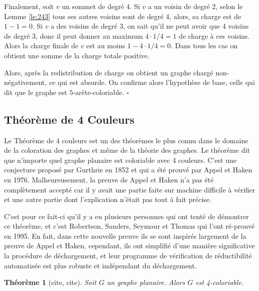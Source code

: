 \documentclass[10pt,a4paper]{article}
\newtheorem{theorem}{Théorème}
\newcommand{\ep}{{\hfill $\square$}}
\begin{document}
Finalement, soit $v$ un sommet de degré 4. Si $v$ a un voisin de degré 2, selon le Lemme \ref{le:243} tous ses autres voisins sont de degré 4, alors, sa charge est de $1-1=0$. Si $v$ a des voisins de degré 3, on sait qu'il ne peut avoir que 4 voisins de degré 3, donc il peut donner au maximum $4 \cdot 1/4=1$ de charge à ces voisins. Alors la charge finale de $v$ est au moins $1 - 4\cdot 1/4 = 0$. Dans tous les cas on obtient une somme de la charge totale positive.

Alors, après la redistribution de charge on obtient un graphe chargé non-négativement, ce qui est absurde. On confirme alors l'hypothèse de base, celle qui dit que le graphe est $5$-arête-coloriable.
\ep 


\subsection{Théorème de 4 Couleurs}

Le Théorème de 4 couleurs est un des théorèmes le plus connu dans le domaine de la coloration des graphes et même de la théorie des graphes. Le théorème dit que n'importe quel graphe planaire est coloriable avec 4 couleurs. C'est une conjecture proposé par Gurthrie en 1852 et qui a été prouvé par Appel et Haken \cite{A&H} en 1976. Malheureusement, la preuve de Appel et Haken n'a pas été complètement accepté car il y avait une partie faite sur machine difficile à vérifier et une autre partie dont l'explication n'était pas tout à fait précise.

C'est pour ce fait-ci qu'il y a eu plusieurs personnes qui ont tenté de démontrer ce théorème, et c'est Robertson, Sanders, Seymour et Thomas \cite{T4C} qui l'ont ré-prouvé en 1995. En fait, dans cette nouvelle preuve ils se sont inspirés largement de la preuve de Appel et Haken, cependant, ils ont simplifié d'une manière significative la procédure de déchargement, et leur programme de vérification de réductibilité automatisée est plus robuste et indépendant du déchargement.

\begin{theorem}[cite, cite]
Soit $G$ un graphe planaire. Alors $G$ est 4-coloriable.
\label{th:4CT}
\end{theorem}
\end{document}
